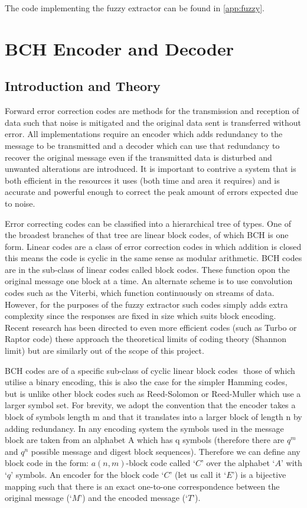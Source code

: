 The code implementing the fuzzy extractor can be found in \autoref{app:fuzzy}.

\section{BCH Encoder and Decoder}

\subsection{Introduction and Theory}

Forward error correction codes are methods for the transmission and reception
of data such that noise is mitigated and the original data sent is transferred
without error.
All implementations require an encoder which adds redundancy to the message to
be transmitted and a decoder which can use that redundancy to recover the
original message even if the transmitted data is disturbed and unwanted
alterations are introduced.
It is important to contrive a system that is both efficient in the resources it
uses (both time and area it requires) and is accurate and powerful enough to
correct the peak amount of errors expected due to noise.

Error correcting codes can be classified into a hierarchical tree of types.
One of the broadest branches of that tree are linear block codes,
of which BCH is one form.
Linear codes are a class of error correction codes in which addition is
closed this means the code is cyclic in the same sense as modular arithmetic.
BCH codes are in the sub-class of linear codes called block codes.
These function opon the original message one block at a time. An alternate scheme
is to use convolution codes such as the Viterbi\cite{viterbi1967error},
which function continuously on
streams of data. However, for the purposes of the fuzzy extractor such codes simply
adds extra complexity since the responses are fixed in size which suits block
encoding.
Recent research has been directed to even more efficient codes (such as Turbo
or Raptor code) these approach the theoretical limits of coding theory
(Shannon limit) but are similarly out of the scope of this project.

BCH codes are of a specific sub-class of cyclic linear block codes  those of
which utilise a binary encoding, this is also the case for the simpler Hamming
codes, but is unlike other block codes such as Reed-Solomon or Reed-Muller
which use a larger symbol set.
For brevity, we adopt the convention that the encoder takes a block of symbols
length m and that it translates into a larger block of length n by adding
redundancy.
In any encoding system the symbols used in the message block are taken from an
alphabet A which has q symbols (therefore there are $q^{m}$ and $q^{n}$
possible message and digest block sequences).
Therefore we can define any block code in the form: $a (n, m)$-block code called
$C$ over the alphabet $A$ with $q$ symbols. An encoder for the block code
$C$ (let us call it $E$) is a bijective mapping such that there is an exact
one-to-one correspondence between the original message ($M$) and the encoded
message ($T$).

